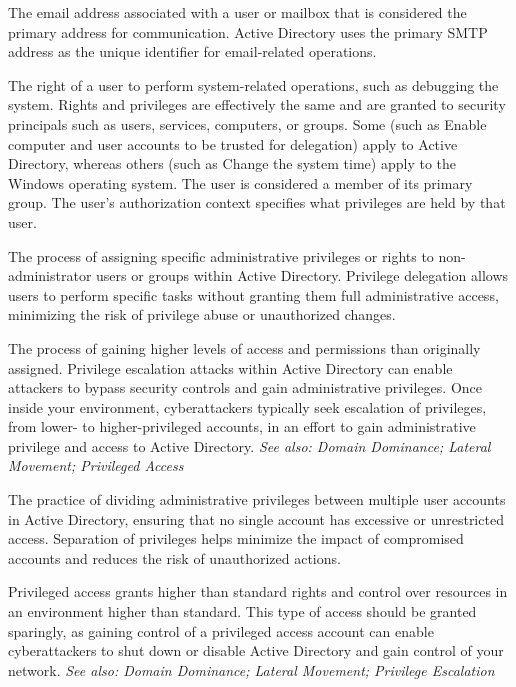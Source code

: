  The email address associated with a user or mailbox that is considered the primary address for communication. Active Directory uses the primary SMTP address as the unique identifier for email-related operations.

 The right of a user to perform system-related operations, such as debugging the system. Rights and privileges are effectively the same and are granted to security principals such as users, services, computers, or groups. Some (such as Enable computer and user accounts to be trusted for delegation) apply to Active Directory, whereas others (such as Change the system time) apply to the Windows operating system. The user is considered a member of its primary group. The user’s authorization context specifies what privileges are held by that user.

 The process of assigning specific administrative privileges or rights to non-administrator users or groups within Active Directory. Privilege delegation allows users to perform specific tasks without granting them full administrative access, minimizing the risk of privilege abuse or unauthorized changes.

 The process of gaining higher levels of access and permissions than originally assigned. Privilege escalation attacks within Active Directory can enable attackers to bypass security controls and gain administrative privileges. Once inside your environment, cyberattackers typically seek escalation of privileges, from lower- to higher-privileged accounts, in an effort to gain administrative privilege and access to Active Directory.
\textit{See also: Domain Dominance; Lateral Movement; Privileged Access}

 The practice of dividing administrative privileges between multiple user accounts in Active Directory, ensuring that no single account has excessive or unrestricted access. Separation of privileges helps minimize the impact of compromised accounts and reduces the risk of unauthorized actions.

 Privileged access grants higher than standard rights and control over resources in an environment higher than standard. This type of access should be granted sparingly, as gaining control of a privileged access account can enable cyberattackers to shut down or disable Active Directory and gain control of your network.
\textit{See also: Domain Dominance; Lateral Movement; Privilege Escalation}

